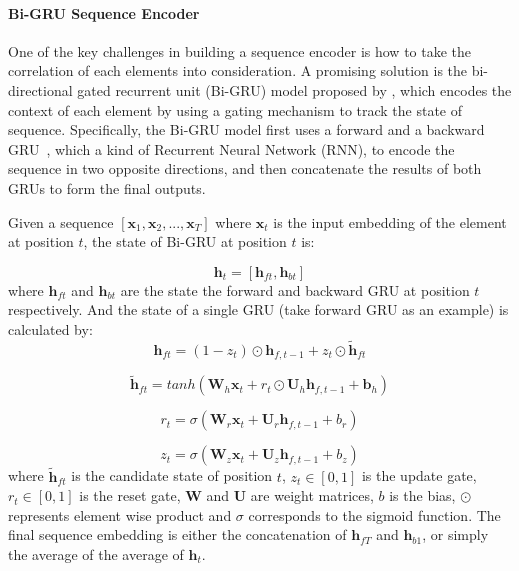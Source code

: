 \paragraph{Bi-GRU Sequence Encoder} 
One of the key challenges in building a sequence encoder is how to take the correlation of each elements into consideration. A promising solution is the bi-directional gated recurrent unit (Bi-GRU) model proposed by \cite{bahdanau2015neural}, which encodes the context of each element by using a gating mechanism to track the state of sequence.
Specifically, the Bi-GRU model first uses a forward and a backward GRU~\cite{cho2014learning}, which a kind of Recurrent Neural Network (RNN), to encode the sequence in two opposite directions, and then concatenate the results of both GRUs to form the final outputs. 

Given a sequence $[\mathbf{x}_1, \mathbf{x}_2, ..., \mathbf{x}_T]$ where $\mathbf{x}_t$ is the input embedding of the element at position $t$, the state of Bi-GRU at position $t$ is:

\begin{equation}
\mathbf{h}_t = [\mathbf{h}_{ft}, \mathbf{h}_{bt}]
\end{equation}
where $\mathbf{h}_{ft}$ and $\mathbf{h}_{bt}$ are the state the forward and backward GRU at position $t$ respectively. And the state of a single GRU (take forward GRU as an example) is calculated by:
\begin{equation}
\mathbf{h}_{ft}=(1-z_t)\odot \mathbf{h}_{f,t-1} + z_t\odot \tilde{\mathbf{h}}_{ft}
\end{equation}

\begin{equation}
\tilde{\mathbf{h}}_{ft}=tanh(\mathbf{W}_h \mathbf{x}_t + r_t\odot \mathbf{U}_h \mathbf{h}_{f,t-1} + \mathbf{b}_h)
\end{equation}

\begin{equation}
r_t=\sigma(\mathbf{W}_r \mathbf{x}_t + \mathbf{U}_r \mathbf{h}_{f,t-1} + b_r)
\end{equation}

\begin{equation}
z_t=\sigma(\mathbf{W}_z \mathbf{x}_t+\mathbf{U}_z \mathbf{h}_{f,t-1} + b_z)
\end{equation}
where $\tilde{\mathbf{h}}_{ft}$ is the candidate state of position $t$, $z_t\in{[0,1]}$ is the update gate, $r_t\in{[0,1]}$ is the reset gate, $\mathbf{W}$ and $\mathbf{U}$ are weight matrices, $b$ is the bias, $\odot$ represents element wise product and $\sigma$ corresponds to the sigmoid function. The final sequence embedding is either the concatenation of $\mathbf{h}_{fT}$ and $\mathbf{h}_{b1}$, or simply the average of the average of $\mathbf{h}_t$.

